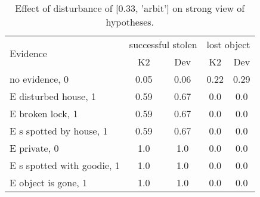 \begin{table}\begin{tabular}{l|cc|cc}\toprule\multirow{2}{*}{Evidence} & \multicolumn{2}{c}{successful stolen}& \multicolumn{2}{c}{lost object}\\& {K2} & {Dev}& {K2} & {Dev}\\\midrule
no evidence, 0 & 0.05&0.06&\cellcolor{Bittersweet}0.22&\cellcolor{Bittersweet}0.29\\E disturbed house, 1 & \cellcolor{Bittersweet}0.59&\cellcolor{Bittersweet}0.67&0.0&0.0\\E broken lock, 1 & \cellcolor{Bittersweet}0.59&\cellcolor{Bittersweet}0.67&0.0&0.0\\E s spotted by house, 1 & \cellcolor{Bittersweet}0.59&\cellcolor{Bittersweet}0.67&0.0&0.0\\E private, 0 & 1.0&1.0&0.0&0.0\\E s spotted with goodie, 1 & 1.0&1.0&0.0&0.0\\E object is gone, 1 & 1.0&1.0&0.0&0.0\\\bottomrule\end{tabular}\caption{Effect of disturbance of [0.33, 'arbit'] on strong view of hypotheses.}\end{table}